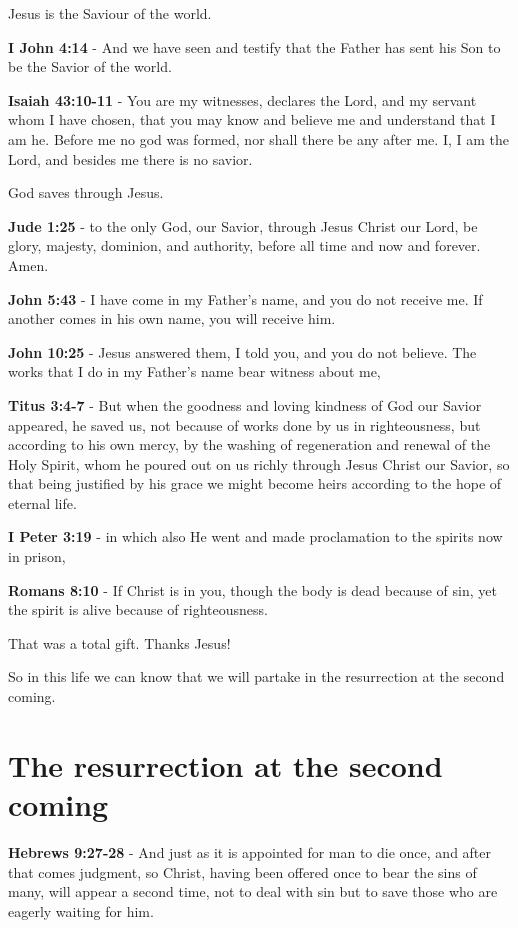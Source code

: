 \documentclass[11pt]{article}
\begin{document}
Jesus is the Saviour of the world.

\textbf{I John 4:14} - And we have seen and testify that the Father has sent his Son to be the Savior of the world.

\textbf{Isaiah 43:10-11} - You are my witnesses, declares the Lord, and my servant whom I have chosen, that you may know and believe me and understand that I am he. Before me no god was formed, nor shall there be any after me. I, I am the Lord, and besides me there is no savior.

God saves through Jesus. 

\textbf{Jude 1:25} - to the only God, our Savior, through Jesus Christ our Lord, be glory, majesty, dominion, and authority, before all time and now and forever. Amen.

\textbf{John 5:43} - I have come in my Father's name, and you do not receive me. If another comes in his own name, you will receive him.

\textbf{John 10:25} - Jesus answered them, I told you, and you do not believe. The works that I do in my Father's name bear witness about me,

\textbf{Titus 3:4-7} - But when the goodness and loving kindness of God our Savior appeared, he saved us, not because of works done by us in righteousness, but according to his own mercy, by the washing of regeneration and renewal of the Holy Spirit, whom he poured out on us richly through Jesus Christ our Savior, so that being justified by his grace we might become heirs according to the hope of eternal life.

\textbf{I Peter 3:19} - in which also He went and made proclamation to the spirits now in prison,

\textbf{Romans 8:10} - If Christ is in you, though the body is dead because of sin, yet the spirit is alive because of righteousness.

That was a total gift. Thanks Jesus!

So in this life we can know that we will partake in the resurrection at the second coming.

\section{The resurrection at the second coming}
\label{sec:org7833409}
\textbf{Hebrews 9:27-28} - And just as it is appointed for man to die once, and after that comes judgment, so Christ, having been offered once to bear the sins of many, will appear a second time, not to deal with sin but to save those who are eagerly waiting for him.
\end{document}
